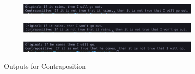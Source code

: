 \begin{figure}[h]
    \begin{subfigure}{1\textwidth}
        \centering
        \includegraphics[width=.8\linewidth]{images/output/4contrap.png}
        \caption*{}
        \label{fig:sfig1}
    \end{subfigure}
    \begin{subfigure}{1\textwidth}
        \centering
        \includegraphics[width=.8\linewidth]{images/output/5contrap.png}
        \caption*{}
        \label{fig:sfig2}
    \end{subfigure}
    \begin{subfigure}{1\textwidth}
        \centering
        \includegraphics[width=.8\linewidth]{images/output/6contrap.png}
        \caption*{}
        \label{fig:sfig3}
    \end{subfigure}
    \caption{Outputs for Contraposition}
    \label{fig:fig}
\end{figure}

